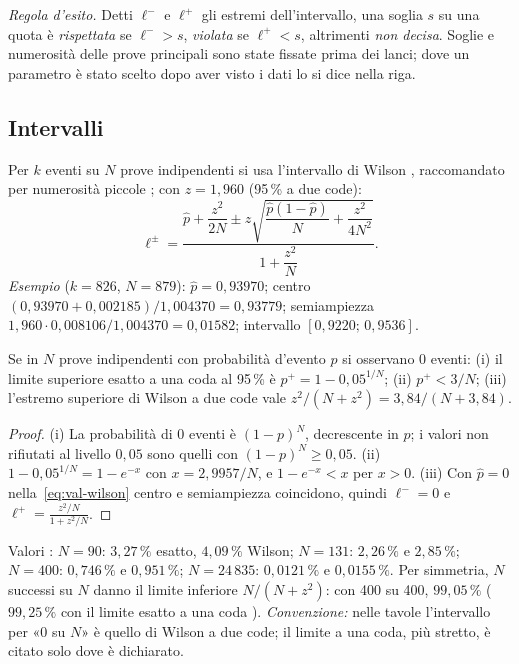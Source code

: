 \emph{Regola d'esito.} Detti $\ell^-$ e $\ell^+$ gli estremi dell'intervallo, una soglia $s$ su una quota è \emph{rispettata} se $\ell^->s$, \emph{violata} se $\ell^+<s$, altrimenti \emph{non decisa}. Soglie e numerosità delle prove principali sono state fissate prima dei lanci; dove un parametro è stato scelto dopo aver visto i dati lo si dice nella riga.

\subsection{Intervalli}\label{sec:val-intervalli}

Per $k$ eventi su $N$ prove indipendenti si usa l'intervallo di Wilson \cite{wilson1927}, raccomandato per numerosità piccole \cite{brown2001}; con $z=1{,}960$ (95\,\% a due code):
\begin{equation}\label{eq:val-wilson}
\ell^\pm=\frac{\hat p+\dfrac{z^2}{2N}\pm z\sqrt{\dfrac{\hat p(1-\hat p)}{N}+\dfrac{z^2}{4N^2}}}{1+\dfrac{z^2}{N}} .
\end{equation}
\emph{Esempio} ($k=826$, $N=879$): $\hat p=0{,}93970$; centro $(0{,}93970+0{,}002185)/1{,}004370=0{,}93779$; semiampiezza $1{,}960\cdot0{,}008106/1{,}004370=0{,}01582$; intervallo $[0{,}9220;\,0{,}9536]$. 

\begin{proposizione}\label{prop:val-zero}
Se in $N$ prove indipendenti con probabilità d'evento $p$ si osservano 0 eventi: (i) il limite superiore esatto a una coda al 95\,\% è $p^+=1-0{,}05^{1/N}$; (ii) $p^+<3/N$; (iii) l'estremo superiore di Wilson a due code vale $z^2/(N+z^2)=3{,}84/(N+3{,}84)$. 
\end{proposizione}
\begin{proof}
(i) La probabilità di 0 eventi è $(1-p)^N$, decrescente in $p$; i valori non rifiutati al livello $0{,}05$ sono quelli con $(1-p)^N\ge0{,}05$. (ii) $1-0{,}05^{1/N}=1-e^{-x}$ con $x=2{,}9957/N$, e $1-e^{-x}<x$ per $x>0$. (iii) Con $\hat p=0$ nella~\eqref{eq:val-wilson} centro e semiampiezza coincidono, quindi $\ell^-=0$ e $\ell^+=\frac{z^2/N}{1+z^2/N}$.
\end{proof}
Valori : $N=90$: $3{,}27\,\%$ esatto, $4{,}09\,\%$ Wilson; $N=131$: $2{,}26\,\%$ e $2{,}85\,\%$; $N=400$: $0{,}746\,\%$ e $0{,}951\,\%$; $N=24\,835$: $0{,}0121\,\%$ e $0{,}0155\,\%$. Per simmetria, $N$ successi su $N$ danno il limite inferiore $N/(N+z^2)$: con 400 su 400, $99{,}05\,\%$ ($99{,}25\,\%$ con il limite esatto a una coda \cite{clopper1934}). \emph{Convenzione:} nelle tavole l'intervallo per «0 su $N$» è quello di Wilson a due code; il limite a una coda, più stretto, è citato solo dove è dichiarato.

